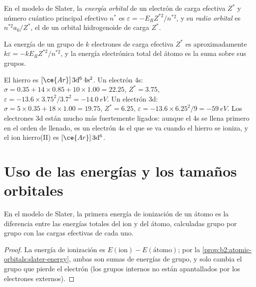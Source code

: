 \begin{definition}\label{def:b2:atomic-orbitals:orbital-energy}
En el modelo de Slater, la \emph{energía orbital} de un electrón
de carga efectiva $Z^*$ y número cuántico principal efectivo $n^*$ es
$\varepsilon = -E_RZ^{*2}/n^{*2}$, y su \emph{radio orbital}
es $n^{*2}a_0/Z^*$, el  de un orbital hidrogenoide de carga
$Z^*$.
\end{definition}

\begin{proposition}\label{prop:b2:atomic-orbitals:slater-energy}
La energía de un grupo de $k$ electrones de carga efectiva $Z^*$ es aproximadamente
$k\varepsilon = -kE_RZ^{*2}/n^{*2}$, y la energía electrónica total del átomo
es la suma sobre sus grupos.
\end{proposition}

\admitted

\begin{example}\label{ex:b2:atomic-orbitals:iron}
El hierro es $[\ce{Ar}]\,3\mathrm d^6\,4\mathrm s^2$. Un electrón 4s: $\sigma = 0.35 + 14
\times 0.85 + 10 \times 1.00 = 22.25$, $Z^* = 3.75$, $\varepsilon = -13.6 \times
3.75^2/3.7^2 = \qty{-14.0}{eV}$. Un electrón 3d: $\sigma = 5 \times 0.35 + 18 \times 1.00 =
19.75$, $Z^* = 6.25$, $\varepsilon = -13.6 \times 6.25^2/9 = \qty{-59}{eV}$. Los electrones
3d están mucho más fuertemente ligados: aunque el 4s se llena primero en el
orden de llenado, es un electrón 4s el que se va cuando el hierro se ioniza, y el
ion hierro(II) es $[\ce{Ar}]\,3\mathrm d^6$.
\end{example}

\section{Uso de las energías y los tamaños orbitales}

\begin{proposition}\label{prop:b2:atomic-orbitals:ionisation}
En el modelo de Slater, la primera energía de ionización de un átomo es la diferencia
entre las energías totales del ion y del átomo, calculadas grupo por grupo
con las cargas efectivas de cada uno.
\end{proposition}

\begin{proof}
La energía de ionización es $E(\text{ion}) - E(\text{átomo})$; por la
\cref{prop:b2:atomic-orbitals:slater-energy}, ambas son sumas de energías de grupo, y
solo cambia el grupo que pierde el electrón (los grupos internos no están apantallados por
los electrones externos).
\end{proof}

